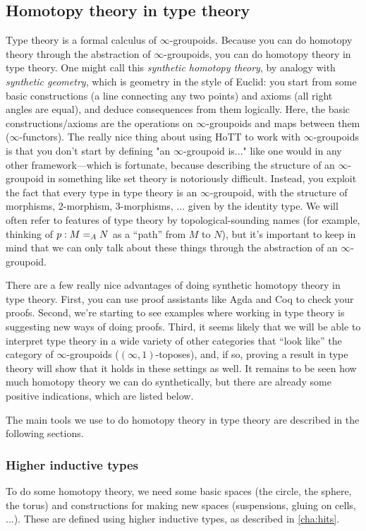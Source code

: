 \subsection{Homotopy theory in type theory}

Type theory is a formal calculus of $\infty$-groupoids. Because you can
do homotopy theory through the abstraction of $\infty$-groupoids, you
can do homotopy theory in type theory.  One might call this
\emph{synthetic homotopy theory}, by analogy with \emph{synthetic
  geometry}, which is geometry in the style of Euclid: you start from
some basic constructions (a line connecting any two points) and axioms
(all right angles are equal), and deduce consequences from them
logically.  Here, the basic constructions/axioms are the operations on
$\infty$-groupoids and maps between them ($\infty$-functors).  The
really nice thing about using HoTT to work with $\infty$-groupoids is
that you don't start by defining "an $\infty$-groupoid is..." like one
would in any other framework---which is fortunate, because describing
the structure of an $\infty$-groupoid in something like set theory is
notoriously difficult.  Instead, you exploit the fact that every type in
type theory is an $\infty$-groupoid, with the structure of morphisms,
2-morphism, 3-morphisms, ... given by the identity type.  We will often
refer to features of type theory by topological-sounding names (for
example, thinking of $p : \id[A] M N$ as a ``path'' from $M$ to $N$),
but it's important to keep in mind that we can only talk about these
things through the abstraction of an $\infty$-groupoid.

There are a few really nice advantages of doing synthetic homotopy theory
in type theory.  First, you can use proof assistants like Agda and Coq
to check your proofs.  Second, we're starting to see examples where
working in type theory is suggesting new ways of doing proofs.  Third,
it seems likely that we will be able to interpret type theory in a wide
variety of other categories that ``look like'' the category of
$\infty$-groupoids ($(\infty,1)$-toposes), and, if so, proving a result
in type theory will show that it holds in these settings as well. It
remains to be seen how much homotopy theory we can do synthetically, but
there are already some positive indications, which are listed below.

The main tools we use to do homotopy theory in type theory are described in the
following sections.

\subsubsection{Higher inductive types} To do some homotopy theory, we need some
  basic spaces (the circle, the sphere, the torus) and constructions for
  making new spaces (suspensions, gluing on cells, ...).  These are
  defined using higher inductive types, as described in
  \autoref{cha:hits}.

